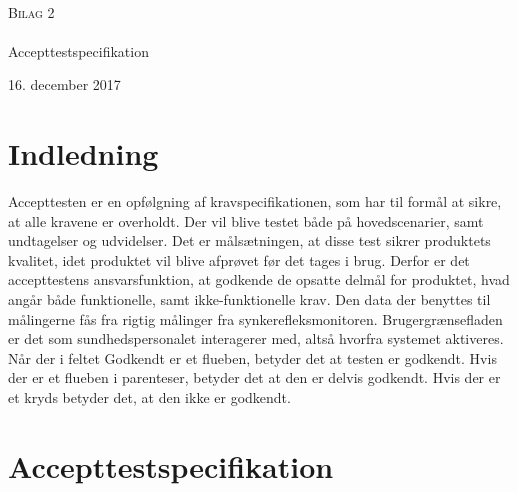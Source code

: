 

\begin{titlingpage}
\begin{center}

~ \\[3cm]


\textsc{\LARGE Bilag 2}\\[1.5cm]


\noindent\makebox[\linewidth]{\rule{\textwidth}{0.4pt}}\\
[0.5cm]{\Huge Accepttestspecifikation}
\noindent\makebox[\linewidth]{\rule{\textwidth}{0.4pt}}
\end{center}
\vfill
\begin{center}
{\large 16. december 2017}
\end{center}
\end{titlingpage}

\newpage
\tableofcontents*


\chapter{Indledning}
Accepttesten er en opfølgning af kravspecifikationen, som har til formål at sikre, at alle kravene er overholdt. Der vil blive testet både på hovedscenarier, samt undtagelser og udvidelser. Det er målsætningen, at disse test sikrer produktets kvalitet, idet produktet vil blive afprøvet før det tages i brug. Derfor er det accepttestens ansvarsfunktion, at godkende de opsatte delmål for produktet, hvad angår både funktionelle, samt ikke-funktionelle krav.
Den data der benyttes til målingerne fås fra rigtig målinger fra synkerefleksmonitoren. Brugergrænsefladen er det som sundhedspersonalet interagerer med, altså hvorfra systemet
aktiveres. Når der i feltet Godkendt er et flueben, betyder det at testen er godkendt. Hvis der er et flueben i parenteser, betyder det at den er delvis godkendt. Hvis der er et kryds betyder
det, at den ikke er godkendt.










\chapter{Accepttestspecifikation}

